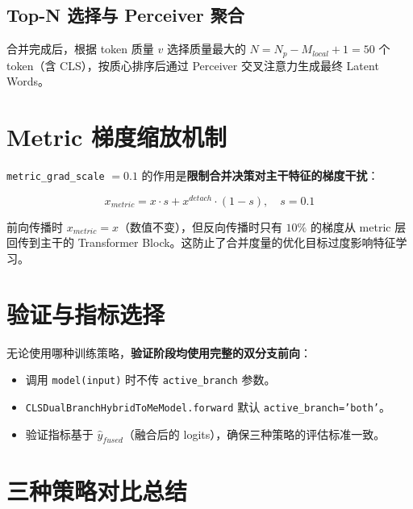 \documentclass[a4paper,11pt]{article}
\begin{document}
\subsection{Top-N 选择与 Perceiver 聚合}

合并完成后，根据 token 质量 $v$ 选择质量最大的 $N = N_p - M_{local} + 1 = 50$ 个 token（含 CLS），按质心排序后通过 Perceiver 交叉注意力生成最终 Latent Words。

\section{Metric 梯度缩放机制}

\texttt{metric\_grad\_scale} $= 0.1$ 的作用是\textbf{限制合并决策对主干特征的梯度干扰}：

\[
    x_{metric} = x \cdot s + x^{detach} \cdot (1 - s), \quad s = 0.1
\]

前向传播时 $x_{metric} = x$（数值不变），但反向传播时只有 $10\%$ 的梯度从 metric 层回传到主干的 Transformer Block。这防止了合并度量的优化目标过度影响特征学习。

\section{验证与指标选择}

无论使用哪种训练策略，\textbf{验证阶段均使用完整的双分支前向}：
\begin{itemize}
    \item 调用 \texttt{model(input)} 时不传 \texttt{active\_branch} 参数。
    \item \texttt{CLSDualBranchHybridToMeModel.forward} 默认 \texttt{active\_branch='both'}。
    \item 验证指标基于 $\hat{y}_{fused}$（融合后的 logits），确保三种策略的评估标准一致。
\end{itemize}

\section{三种策略对比总结}
\end{document}

